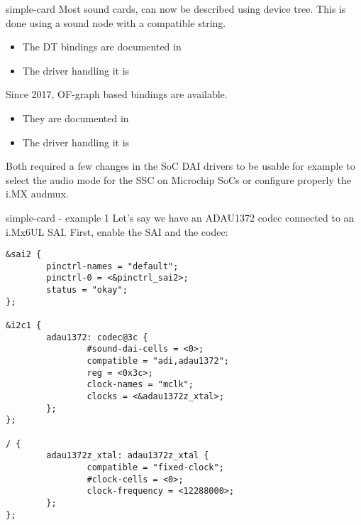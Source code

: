 \begin{frame}[fragile]{simple-card}
  Most sound cards, can now be described using device tree. This is
  done using a sound node with a  compatible
  string.
  \begin{itemize}
  \item The DT bindings are documented in
  \item The driver handling it is 
  \end{itemize}
  Since 2017, OF-graph based bindings are available.
  \begin{itemize}
  \item They are documented in
  \item The driver handling it is 
  \end{itemize}
  Both required a few changes in the SoC DAI drivers to be usable for
  example to select the audio mode for the SSC on Microchip SoCs or
  configure properly the i.MX audmux.
\end{frame}

\begin{frame}[fragile]{simple-card - example 1}
  Let's say we have an ADAU1372 codec connected to an i.Mx6UL SAI.
  First, enable the SAI and the codec:
  \begin{block}{}
    \fontsize{7}{6}\selectfont
    \begin{verbatim}
&sai2 {
        pinctrl-names = "default";
        pinctrl-0 = <&pinctrl_sai2>;
        status = "okay";
};

&i2c1 {
        adau1372: codec@3c {
                #sound-dai-cells = <0>;
                compatible = "adi,adau1372";
                reg = <0x3c>;
                clock-names = "mclk";
                clocks = <&adau1372z_xtal>;
        };
};

/ {
        adau1372z_xtal: adau1372z_xtal {
                compatible = "fixed-clock";
                #clock-cells = <0>;
                clock-frequency = <12288000>;
        };
};
    \end{verbatim}
  \end{block}
\end{frame}

